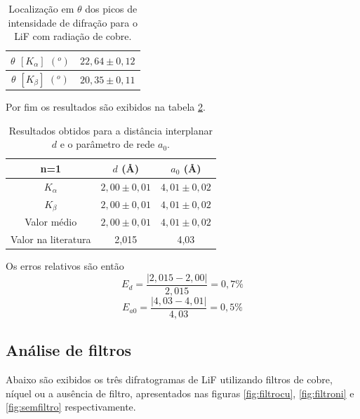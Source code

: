 \documentclass[article,12pt,openright,oneside,a4paper,brazil]{abntex2}
\begin{document}
\begin{table}[H]
    \centering
    \caption{Localização em $\theta$ dos picos de intensidade de difração para o LiF com radiação de cobre.}
    \begin{tabular}{|c|c|}
        \hline
        $\theta$ $[K_\alpha]$ $(^o)$ & $22,64\pm0,12$ \\ \hline
        $\theta$ $[K_\beta]$ $(^o)$ & $20,35\pm0,11$ \\ \hline
    \end{tabular}
    \label{tab:dLiF}
\end{table}

Por fim os resultados são exibidos na tabela \ref{tab:LiF}.

\begin{table}[H]
    \centering
    \caption{Resultados obtidos para a distância interplanar $d$ e o parâmetro de rede $a_0$.}
    \begin{tabular}{|c|c|c|}
        \hline
        n=1 & $d$ (\r{A}) & $a_0$ (\r{A}) \\ \hline
        $K_\alpha$ & $2,00\pm0,01$ & $4,01\pm0,02$ \\ \hline
        $K_\beta$ & $2,00\pm0,01$ & $4,01\pm0,02$ \\ \hline
        Valor médio & $2,00\pm0,01$ & $4,01\pm0,02$ \\ \hline
        Valor na literatura & 2,015 & 4,03 \\ \hline
    \end{tabular}
    \label{tab:LiF}
\end{table}

Os erros relativos são então
$$E_d=\frac{|2,015-2,00|}{2,015}=0,7\%$$
$$E_{a0}=\frac{|4,03-4,01|}{4,03}=0,5\%$$

\subsection{Análise de filtros}

Abaixo são exibidos os três difratogramas de LiF utilizando filtros de cobre, níquel ou a ausência de filtro, apresentados nas figuras \ref{fig:filtrocu}, \ref{fig:filtroni} e \ref{fig:semfiltro} respectivamente.
\end{document}
